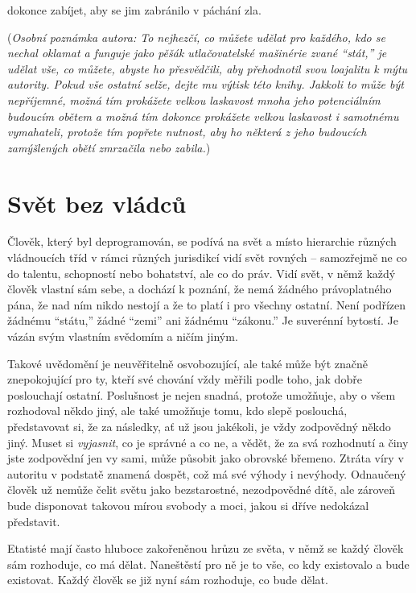 \documentclass{book}
\begin{document}
dokonce zabíjet, aby se jim zabránilo v páchání zla.

(\emph{Osobní poznámka autora: To nejhezčí, co můžete udělat pro každého, kdo se nechal oklamat a funguje jako pěšák utlačovatelské mašinérie zvané \enquote{stát,} je udělat vše, co můžete, abyste ho přesvědčili, aby přehodnotil svou loajalitu k mýtu autority. Pokud vše ostatní selže, dejte mu výtisk této knihy. Jakkoli to může být nepříjemné, možná tím prokážete velkou laskavost mnoha jeho potenciálním budoucím obětem a možná tím dokonce prokážete velkou laskavost i samotnému vymahateli, protože tím popřete nutnost, aby ho některá z jeho budoucích zamýšlených obětí zmrzačila nebo zabila.})

\section{Svět bez vládců}

Člověk, který byl deprogramován, se podívá na svět a místo hierarchie různých vládnoucích tříd v rámci různých jurisdikcí vidí svět rovných -- samozřejmě ne co do talentu, schopností nebo bohatství, ale co do práv. Vidí svět, v němž každý člověk vlastní sám sebe, a dochází k poznání, že nemá žádného právoplatného pána, že nad ním nikdo nestojí a že to platí i pro všechny ostatní. Není podřízen žádnému \enquote{státu,} žádné \enquote{zemi} ani žádnému \enquote{zákonu.} Je suverénní bytostí. Je vázán svým vlastním svědomím a ničím jiným.

Takové uvědomění je neuvěřitelně osvobozující, ale také může být značně znepokojující pro ty, kteří své chování vždy měřili podle toho, jak dobře poslouchají ostatní. Poslušnost je nejen snadná, protože umožňuje, aby o všem rozhodoval někdo jiný, ale také umožňuje tomu, kdo slepě poslouchá, představovat si, že za následky, ať už jsou jakékoli, je vždy zodpovědný někdo jiný. Muset si \emph{vyjasnit}, co je správné a co ne, a vědět, že za svá rozhodnutí a činy jste zodpovědní jen vy sami, může působit jako obrovské břemeno. Ztráta víry v autoritu v podstatě znamená dospět, což má své výhody i nevýhody. Odnaučený člověk už nemůže čelit světu jako bezstarostné, nezodpovědné dítě, ale zároveň bude disponovat takovou mírou svobody a moci, jakou si dříve nedokázal představit.

Etatisté mají často hluboce zakořeněnou hrůzu ze světa, v němž se každý člověk sám rozhoduje, co má dělat. Naneštěstí pro ně je to vše, co kdy existovalo a bude existovat. Každý člověk se již nyní sám rozhoduje, co bude dělat.
\end{document}
